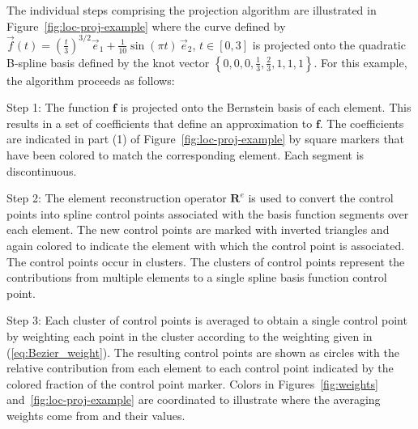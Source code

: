 The individual steps comprising the \Bezier projection algorithm are
illustrated in Figure~\ref{fig:loc-proj-example} where
the curve defined by $\vec{f}(t)=\left( \frac{t}{3}
\right)^{3/2}\vec{e}_1+\frac{1}{10}\sin (\pi t )\,\vec{e}_2$,
$t\in[0,3]$ is projected onto the quadratic B-spline basis defined by
the knot vector $\left\{0,0,0,\frac{1}{3},\frac{2}{3},1,1,1\right\}$. For this example,
the algorithm proceeds as follows:

\begin{description}

    \item{Step 1:} The function $\mathbf{f}$ is projected onto the Bernstein basis of each element. This results in a set of
          \Bezier coefficients that define an approximation to $\mathbf{f}$.
          The \Bezier coefficients are indicated in part (1) of Figure~\ref{fig:loc-proj-example} by
          square markers that have been colored to match the corresponding
          element. Each \Bezier segment is discontinuous.

    \item{Step 2:} The element reconstruction operator $\mathbf{R}^e$ is used to convert the
          \Bezier control points into spline control points associated with the
          basis function segments over each element.
          The new control points are marked with inverted triangles and
          again colored to indicate the element with which the control point is
          associated. The control points occur in clusters.
          The clusters of control points represent the contributions from
          multiple elements to a single spline basis function control point.

    \item{Step 3:} Each cluster of control points is averaged to obtain a
          single control point by weighting each point in the cluster according
          to the weighting given in (\ref{eq:Bezier_weight}). The resulting control
          points are shown as circles with the relative contribution from each
          element to each control point indicated by the colored fraction of the
          control point marker. Colors in Figures~\ref{fig:weights} and~\ref{fig:loc-proj-example} are coordinated
          to illustrate where the averaging weights come from and their values.
\end{description}

